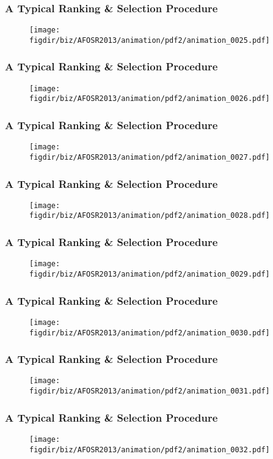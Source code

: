\documentclass[13pt]{beamer}
\newcommand{\figdir}{../../fig}
\begin{document}
\begin{frame}\frametitle{A Typical Ranking \& Selection Procedure}\begin{figure}\texttt{[image: \\figdir/biz/AFOSR2013/animation/pdf2/animation\_0025.pdf]}\end{figure}\end{frame}
\begin{frame}\frametitle{A Typical Ranking \& Selection Procedure}\begin{figure}\texttt{[image: \\figdir/biz/AFOSR2013/animation/pdf2/animation\_0026.pdf]}\end{figure}\end{frame}
\begin{frame}\frametitle{A Typical Ranking \& Selection Procedure}\begin{figure}\texttt{[image: \\figdir/biz/AFOSR2013/animation/pdf2/animation\_0027.pdf]}\end{figure}\end{frame}
\begin{frame}\frametitle{A Typical Ranking \& Selection Procedure}\begin{figure}\texttt{[image: \\figdir/biz/AFOSR2013/animation/pdf2/animation\_0028.pdf]}\end{figure}\end{frame}
\begin{frame}\frametitle{A Typical Ranking \& Selection Procedure}\begin{figure}\texttt{[image: \\figdir/biz/AFOSR2013/animation/pdf2/animation\_0029.pdf]}\end{figure}\end{frame}
\begin{frame}\frametitle{A Typical Ranking \& Selection Procedure}\begin{figure}\texttt{[image: \\figdir/biz/AFOSR2013/animation/pdf2/animation\_0030.pdf]}\end{figure}\end{frame}
\begin{frame}\frametitle{A Typical Ranking \& Selection Procedure}\begin{figure}\texttt{[image: \\figdir/biz/AFOSR2013/animation/pdf2/animation\_0031.pdf]}\end{figure}\end{frame}
\begin{frame}\frametitle{A Typical Ranking \& Selection Procedure}\begin{figure}\texttt{[image: \\figdir/biz/AFOSR2013/animation/pdf2/animation\_0032.pdf]}\end{figure}\end{frame}
\end{document}
